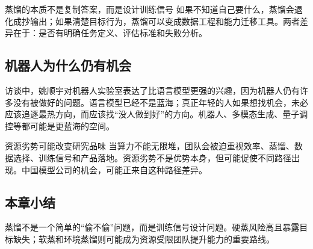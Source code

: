 \begin{importantbox}{蒸馏的本质不是复制答案，而是设计训练信号}
如果不知道自己要什么，蒸馏会退化成抄输出；如果清楚目标行为，蒸馏可以变成数据工程和能力迁移工具。两者差异在于：是否有明确任务定义、评估标准和失败分析。
\end{importantbox}

\subsection{机器人为什么仍有机会}

访谈中，姚顺宇对机器人实验室表达了比语言模型更强的兴趣，因为机器人仍有许多没有被做好的问题。语言模型已经不是蓝海；真正年轻的人如果想找机会，未必应该追逐最热方向，而应该找“没人做到好”的方向。机器人、多模态生成、量子调控等都可能是更蓝海的空间。

\begin{knowledgebox}{资源劣势可能改变研究品味}
当算力不能无限堆，团队会被迫重视效率、蒸馏、数据选择、训练信号和产品落地。资源劣势不是优势本身，但可能促使不同路径出现。中国模型公司的机会，可能正来自这种路径差异。
\end{knowledgebox}

\subsection{本章小结}

蒸馏不是一个简单的“偷不偷”问题，而是训练信号设计问题。硬蒸风险高且暴露目标缺失；软蒸和环境蒸馏则可能成为资源受限团队提升能力的重要路线。

